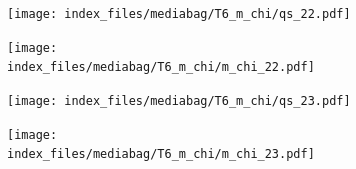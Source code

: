 \documentclass[
  11pt,
  letterpaper,
]{scrreprt}
\begin{document}
\begin{figure}

\begin{minipage}{0.50\linewidth}

\begin{figure}[H]

{\centering \texttt{[image: index\_files/mediabag/T6\_m\_chi/qs\_22.pdf]}

}


\end{figure}%

\end{minipage}%
%
\begin{minipage}{0.50\linewidth}

\begin{figure}[H]

{\centering \texttt{[image: index\_files/mediabag/T6\_m\_chi/m\_chi\_22.pdf]}

}


\end{figure}%

\end{minipage}%

\end{figure}%

\begin{figure}

\begin{minipage}{0.50\linewidth}

\begin{figure}[H]

{\centering \texttt{[image: index\_files/mediabag/T6\_m\_chi/qs\_23.pdf]}

}


\end{figure}%

\end{minipage}%
%
\begin{minipage}{0.50\linewidth}

\begin{figure}[H]

{\centering \texttt{[image: index\_files/mediabag/T6\_m\_chi/m\_chi\_23.pdf]}

}


\end{figure}%

\end{minipage}%

\end{figure}%
\end{document}
